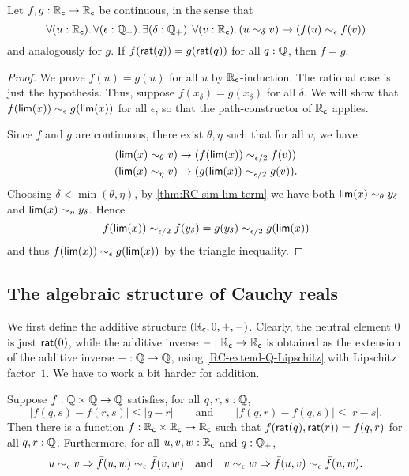 \begin{lem}\label{RC-continuous-eq}
  Let $f,g:\mathbb{R}_\mathsf{c}\to\mathbb{R}_\mathsf{c}$ be continuous, in the sense that
  \[ \fall{u:\RC}{\epsilon:\Qp}\exis{\delta:\Qp}\fall{v:\RC} (u\close\delta v) \to (f(u) \close\epsilon f(v)) \]
  and analogously for $g$.
  If $f(\mathsf{rat}(q))=g(\mathsf{rat}(q))$ for all $q:\mathbb{Q}$, then $f=g$.
\end{lem}
\begin{proof}
  We prove $f(u)=g(u)$ for all $u$ by $\mathbb{R}_\mathsf{c}$-induction.
  The rational case is just the hypothesis.
  Thus, suppose $f(x_\delta)=g(x_\delta)$ for all $\delta$.
  We will show that $f(\mathsf{lim}(x))\sim_{\epsilon} g(\mathsf{lim}(x))$ for all $\epsilon$, so that the path-constructor of $\mathbb{R}_\mathsf{c}$ applies.

  Since $f$ and $g$ are continuous, there exist $\theta,\eta$ such that for all $v$, we have
  \begin{align*}
    (\mathsf{lim}(x)\sim_{\theta} v) &\to (f(\mathsf{lim}(x)) \sim_{\epsilon/2} f(v))\\
    (\mathsf{lim}(x)\sim_{\eta} v) &\to (g(\mathsf{lim}(x)) \sim_{\epsilon/2} g(v)).
  \end{align*}
  Choosing $\delta < \min(\theta,\eta)$, by \autoref{thm:RC-sim-lim-term} we have both $\mathsf{lim}(x)\sim_{\theta} y_\delta$ and $\mathsf{lim}(x)\sim_{\eta} y_\delta$.
  Hence
  \[ f(\mathsf{lim}(x)) \sim_{\epsilon/2} f(y_\delta) = g(y_\delta) \sim_{\epsilon/2} g(\mathsf{lim}(x))\]
  and thus $f(\mathsf{lim}(x))\sim_{\epsilon} g(\mathsf{lim}(x))$ by the triangle inequality.
\end{proof}

\subsection{The algebraic structure of Cauchy reals}
\label{sec:algebr-struct-cauchy}

We first define the additive structure $(\mathbb{R}_\mathsf{c}, 0, {+}, {-})$. Clearly, the neutral element
$0$ is just $\mathsf{rat}(0)$, while the additive inverse ${-} : \mathbb{R}_\mathsf{c} \to \mathbb{R}_\mathsf{c}$ is obtained as the
extension of the additive inverse ${-} : \mathbb{Q} \to \mathbb{Q}$, using \autoref{RC-extend-Q-Lipschitz}
with Lipschitz factor~$1$. We have to work a bit harder for addition.

\begin{lem} \label{RC-binary-nonexpanding-extension}
  Suppose $f : \mathbb{Q} \times \mathbb{Q} \to \mathbb{Q}$ satisfies, for all $q, r, s : \mathbb{Q}$,
  \begin{equation*}
    |f(q, s) - f(r, s)| \leq |q - r|
    \qquad\text{and}\qquad
    |f(q, r) - f(q, s)| \leq |r - s|.
  \end{equation*}
  Then there is a function $\bar{f} : \mathbb{R}_\mathsf{c} \times \mathbb{R}_\mathsf{c} \to \mathbb{R}_\mathsf{c}$ such that
  $\bar{f}(\mathsf{rat}(q), \mathsf{rat}(r)) = f(q,r)$ for all $q, r : \mathbb{Q}$. Furthermore,
  for all $u, v, w : \mathbb{R}_\mathsf{c}$ and $q : \mathbb{Q}_{+}$,
  \begin{equation*}
    u \sim_{\epsilon} v \Rightarrow \bar{f}(u,w) \sim_{\epsilon} \bar{f}(v,w)
    \quad\text{and}\quad
    v \sim_{\epsilon} w \Rightarrow \bar{f}(u,v) \sim_{\epsilon} \bar{f}(u,w).
  \end{equation*}
\end{lem}

